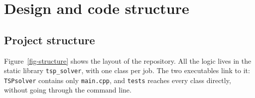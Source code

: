\documentclass[10pt,a4paper]{article}
\makeatletter
\let\tsp@section\section
\renewcommand{\section}{\FloatBarrier\tsp@section}
\makeatother
\begin{document}
\section{Design and code structure}\label{sec-design}

\subsection{Project structure}\label{sec-structure}

Figure~\ref{fig-structure} shows the layout of the repository. All the logic lives in the static library \texttt{tsp\_solver}, with one class per job. The two executables link to it: \texttt{TSPsolver} contains only \texttt{main.cpp}, and \texttt{tests} reaches every class directly, without going through the command line.
\end{document}
